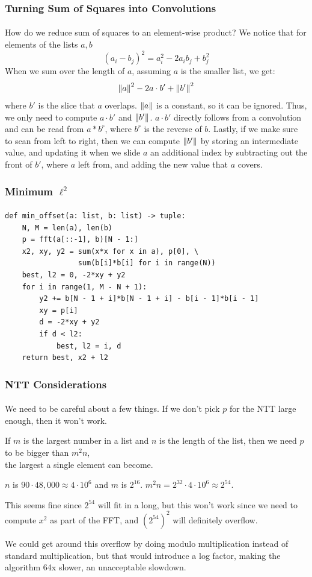 \documentclass{beamer}                             %
\begin{document}
\begin{frame}
\frametitle{Turning Sum of Squares into Convolutions}
\framesubtitle{}
How do we reduce sum of squares to an element-wise product?
\pause
We notice that for elements of the lists \( a, b \)
\[ (a_i - b_j)^2 = a_i^2 - 2a_i b_j + b_j^2 \]
\pause 
When we sum over the length of \( a \),
assuming \( a \) is the smaller list, we get:
\[ \norm{a}^2 - 2 a \cdot b' + \norm{b'}^2 \] 
where \( b' \) is the slice that \( a \) overlaps.
\pause
\( \norm{a} \) is a constant, so it can be ignored.
Thus, we only need to compute \( a \cdot b' \) and \( \norm{b'} \).
\pause
\( a \cdot b' \) directly follows from a convolution and
can be read from \( a * b^r \), where \( b^r \) is the reverse of \( b \).
\pause
Lastly, if we make sure to scan from left to right, then we can compute
\( \norm{b'} \) by storing an intermediate value, and updating it when we slide 
\( a \) an additional index by subtracting out the front of \( b' \), where
\( a \) left from, and adding the new value that \( a \) covers.
\end{frame}

\begin{frame}[fragile]
\frametitle{Minimum \( \ell^2 \)}
\framesubtitle{}
\begin{verbatim}
def min_offset(a: list, b: list) -> tuple:
    N, M = len(a), len(b)
    p = fft(a[::-1], b)[N - 1:]
    x2, xy, y2 = sum(x*x for x in a), p[0], \
                 sum(b[i]*b[i] for i in range(N))
    best, l2 = 0, -2*xy + y2
    for i in range(1, M - N + 1):
        y2 += b[N - 1 + i]*b[N - 1 + i] - b[i - 1]*b[i - 1]
        xy = p[i]
        d = -2*xy + y2
        if d < l2:
            best, l2 = i, d
    return best, x2 + l2
\end{verbatim}
\end{frame}

\begin{frame}
\frametitle{NTT Considerations}
\framesubtitle{}
We need to be careful about a few things. If we don't pick \( p \) for the NTT
large enough, then it won't work. \pause

If \( m \) is the largest number in a list
and \( n \) is the length of the list, then we need \( p \) to be bigger than
\( m^2 n \), \\ the largest a single element can become. \pause

\( n \) is \( 90 \cdot 48,000 \approx 4 \cdot 10^6 \) and \( m \) is
\( 2^{16} \). \( m^2 n = 2^{32} \cdot 4 \cdot 10^6 \approx 2^{54} \). \pause

This seems fine since \( 2^{54} \) will fit in a long, but this won't work
since we need to compute \( x^2 \) as part of the FFT, and \( (2^{54})^2 \)
will definitely overflow. \pause

We could get around this overflow by doing modulo
multiplication instead of standard multiplication, but that would introduce
a log factor, making the algorithm 64x slower, an unacceptable slowdown.
\end{frame}
\end{document}

